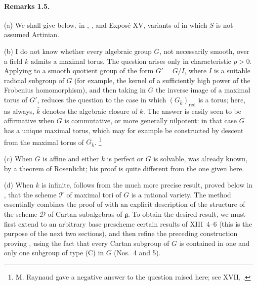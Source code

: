 \paragraph{\textbf{Remarks 1.5.}}
\textup{(a)} We shall give below, in , , and Exposé XV,
variants of  in which \(S\) is not assumed Artinian.

\medskip
\noindent\textup{(b)} I do not know whether every algebraic group
\(G\), not necessarily smooth, over a field \(k\) admits a maximal
torus. The question arises only in characteristic \(p>0\). Applying
 to a smooth quotient group of the form \(G'=G/I\), where \(I\)
is a suitable radicial subgroup of \(G\) \textup{(for example, the
kernel of a sufficiently high power of the Frobenius homomorphism)},
and then taking in \(G\) the inverse image of a maximal torus of
\(G'\), reduces the question to the case in which
\((G_{\bar k})_{\mathrm{red}}\) is a torus; here, as always,
\(\bar k\) denotes the algebraic closure of \(k\). The answer is
easily seen to be affirmative when \(G\) is commutative, or more
generally nilpotent: in that case \(G\) has a unique maximal torus,
which may for example be constructed by descent from the maximal
torus of \(G_{\bar k}\).\begingroup
\renewcommand{\thefootnote}{*}\footnote{M. Raynaud gave a negative
answer to the question raised here; see XVII, .}
\endgroup

\medskip
\noindent\textup{(c)} When \(G\) is affine and either \(k\) is
perfect or \(G\) is solvable,  was already known, by a theorem of
Rosenlicht; his proof is quite different from the one given here.

\medskip
\noindent\textup{(d)} When \(k\) is infinite,  follows from the
much more precise result, proved below in , that the scheme
\(\mathcal T\) of maximal tori of \(G\) is a rational variety. The
method essentially combines the proof of  with an explicit
description of the structure of the scheme \(\mathcal D\) of Cartan
subalgebras of \(\mathfrak g\). To obtain the desired result, we
must first extend to an arbitrary base prescheme certain results of
XIII~4--6 \textup{(this is the purpose of the next two sections)},
and then refine the preceding construction proving , using the
fact that every Cartan subgroup of \(G\) is contained in one and
only one subgroup of type \textup{(C)} in \(G\) \textup{(Nos.~4
and 5)}.

